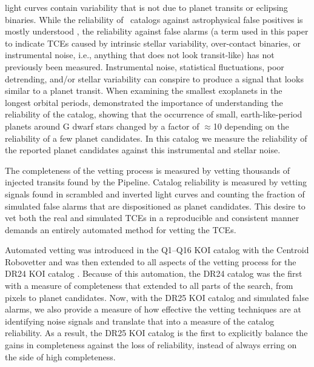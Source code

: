 \Kepler{} light curves contain variability that is not due to planet transits or eclipsing binaries. While the reliability of \Kepler\ catalogs against astrophysical false positives is mostly understood \citep[see e.g.][]{Morton2016}, the reliability against false alarms (a term used in this paper to indicate TCEs caused by intrinsic stellar variability, over-contact binaries, or instrumental noise, i.e., anything that does not look transit-like) has not previously been measured. Instrumental noise, statistical fluctuations, poor detrending, and/or stellar variability can conspire to produce a signal that looks similar to a planet transit. When examining the smallest exoplanets in the longest orbital periods, \citet{Burke2015} demonstrated the importance of understanding the reliability of the catalog, showing that the occurrence of small, earth-like-period planets around G dwarf stars changed by a factor of $\approx$10 depending on the reliability of a few planet candidates.  In this catalog we measure the reliability of the reported planet candidates against this instrumental and stellar noise.  

The completeness of the vetting process is measured by vetting thousands of injected transits found by the \Kepler{} Pipeline. Catalog reliability is measured by vetting signals found in scrambled and inverted \Kepler{} light curves and counting the fraction of simulated false alarms that are dispositioned as planet candidates. This desire to vet both the real and simulated TCEs in a reproducible and consistent manner demands an entirely automated method for vetting the TCEs.  

Automated vetting was introduced in the Q1--Q16 KOI catalog \citep{Mullally2015cat} with the Centroid Robovetter and was then extended to all aspects of the vetting process for the DR24 KOI catalog \citep{Coughlin2016}. Because of this automation, the DR24 catalog was the first with a measure of completeness that extended to all parts of the search, from pixels to planet candidates.  Now, with the DR25 KOI catalog and simulated false alarms, we also provide a measure of how effective the vetting techniques are at identifying noise signals and translate that into a measure of the catalog reliability. As a result, the DR25 KOI catalog is the first to explicitly balance the gains in completeness against the loss of reliability, instead of always erring on the side of high completeness. 



